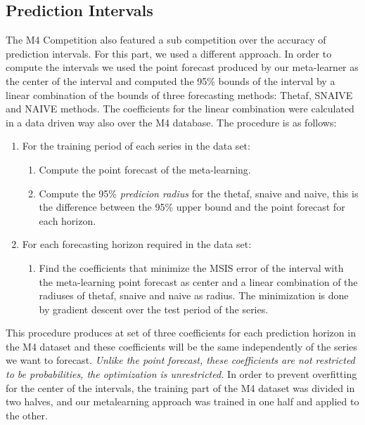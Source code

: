 \documentclass[11pt,a4paper,]{article}
\providecommand{\tightlist}{%
  \setlength{\itemsep}{0pt}\setlength{\parskip}{0pt}}
\theoremstyle{definition}
\theoremstyle{definition}
\theoremstyle{definition}
\theoremstyle{remark}
\begin{document}
\subsection{Prediction Intervals}\label{prediction-intervals}

The M4 Competition also featured a sub competition over the accuracy of
prediction intervals. For this part, we used a different approach. In
order to compute the intervals we used the point forecast produced by
our meta-learner as the center of the interval and computed the 95\%
bounds of the interval by a linear combination of the bounds of three
forecasting methods: Thetaf, SNAIVE and NAIVE methods. The coefficients
for the linear combination were calculated in a data driven way also
over the M4 database. The procedure is as follows:

\begin{enumerate}
\def\labelenumi{\arabic{enumi}.}
\tightlist
\item
  For the training period of each series in the data set:

  \begin{enumerate}
  \def\labelenumii{\arabic{enumii}.}
  \tightlist
  \item
    Compute the point forecast of the meta-learning.
  \item
    Compute the 95\% \emph{predicion radius} for the thetaf, snaive and
    naive, this is the difference between the 95\% upper bound and the
    point forecast for each horizon.
  \end{enumerate}
\item
  For each forecasting horizon required in the data set:

  \begin{enumerate}
  \def\labelenumii{\arabic{enumii}.}
  \tightlist
  \item
    Find the coefficients that minimize the MSIS error of the interval
    with the meta-learning point forecast as center and a linear
    combination of the radiuses of thetaf, snaive and naive as radius.
    The minimization is done by gradient descent over the test period of
    the series.
  \end{enumerate}
\end{enumerate}

This procedure produces at set of three coefficients for each prediction
horizon in the M4 dataset and these coefficients will be the same
independently of the series we want to forecast. \emph{Unlike the point
forecast, these coefficients are not restricted to be probabilities, the
optimization is unrestricted.} In order to prevent overfitting for the
center of the intervals, the training part of the M4 dataset was divided
in two halves, and our metalearning approach was trained in one half and
applied to the other.
\end{document}

